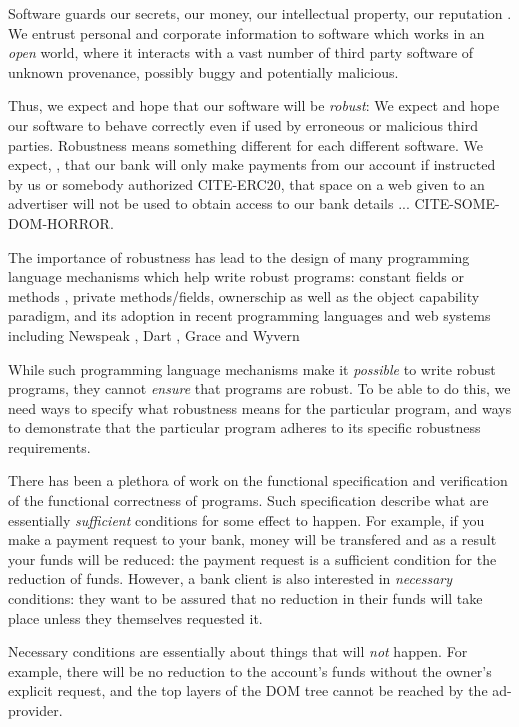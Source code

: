 Software guards our secrets, our money, our intellectual property,
our reputation \cite{covfefe}.  We entrust personal and
corporate information to software which works in an \emph{open} world, 
where  it interacts with a vast number of
third party software of unknown provenance, possibly buggy and potentially malicious.

Thus, we expect and hope that our software will be \emph{robust}:
We expect and hope our software to behave correctly even if  used 
by erroneous or malicious third parties. Robustness means 
something different for each different software.
 We expect, \eg, that our bank will only make payments 
from our account if instructed by us or somebody authorized CITE-ERC20,
that  space on a web given to an advertiser will not be used
to obtain access to our bank details ... CITE-SOME-DOM-HORROR.

The importance of robustness has lead to the design of many programming
language mechanisms which help write robust programs:
constant fields or methods \cite{...}, private methods/fields\cite{...}, ownerschip\cite{...}
as well as the object capability paradigm\cite{millerPhDThesis},
and its adoption in recent programming languages and web systems
\cite{CapJavaHayesAPLAS17,CapNetSocc17Eide,DOCaT14} including Newspeak
\cite{newspeak17}, Dart \cite{dart15}, Grace \cite{grace,graceClasses}
and Wyvern \cite{wyverncapabilities}

While such programming language mechanisms make it \textit{possible} to write robust
programs, they cannot \textit{ensure} that programs are robust. 
To be able to do this, we need ways to specify what robustness means for the 
particular program, and ways to demonstrate that the particular program 
adheres to its specific robustness requirements.

There has been a plethora of work on the functional specification and verification of the
functional correctness of programs. Such specification describe what are
essentially \emph{sufficient} conditions for some
effect to happen. For example, if you make a payment request to your bank, money will be transfered
and as a result your funds will be reduced: the payment request is a sufficient condition for the
reduction of funds. However, a bank client is also interested in \emph{necessary} conditions:
they want to be assured that no reduction in their funds will take place unless they themselves
requested it.

Necessary conditions are essentially about things that will {\em not} happen. For example,
there  will be no reduction to the account's funds without the owner's explicit request, and
the top layers of the DOM tree cannot be reached by the ad-provider.


